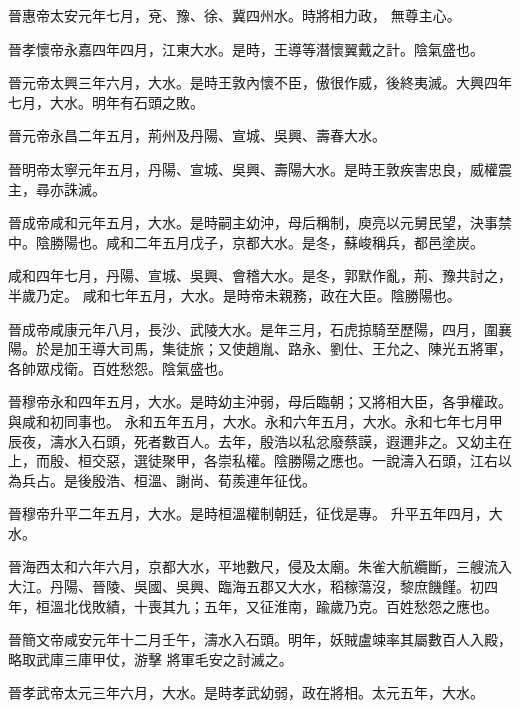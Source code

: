 \begin{pinyinscope}
 晉惠帝太安元年七月，兗、豫、徐、冀四州水。時將相力政，
 無尊主心。



 晉孝懷帝永嘉四年四月，江東大水。是時，王導等潛懷翼戴之計。陰氣盛也。



 晉元帝太興三年六月，大水。是時王敦內懷不臣，傲很作威，後終夷滅。大興四年七月，大水。明年有石頭之敗。



 晉元帝永昌二年五月，荊州及丹陽、宣城、吳興、壽春大水。



 晉明帝太寧元年五月，丹陽、宣城、吳興、壽陽大水。是時王敦疾害忠良，威權震主，尋亦誅滅。



 晉成帝咸和元年五月，大水。是時嗣主幼沖，母后稱制，庾亮以元舅民望，決事禁中。陰勝陽也。咸和二年五月戊子，京都大水。是冬，蘇峻稱兵，都邑塗炭。



 咸和四年七月，丹陽、宣城、吳興、會稽大水。是冬，郭默作亂，荊、豫共討之，半歲乃定。
 咸和七年五月，大水。是時帝未親務，政在大臣。陰勝陽也。



 晉成帝咸康元年八月，長沙、武陵大水。是年三月，石虎掠騎至歷陽，四月，圍襄陽。於是加王導大司馬，集徒旅；又使趙胤、路永、劉仕、王允之、陳光五將軍，各帥眾戍衛。百姓愁怨。陰氣盛也。



 晉穆帝永和四年五月，大水。是時幼主沖弱，母后臨朝；又將相大臣，各爭權政。與咸和初同事也。
 永和五年五月，大水。永和六年五月，大水。永和七年七月甲辰夜，濤水入石頭，死者數百人。去年，殷浩以私忿廢蔡謨，遐邇非之。又幼主在上，而殷、桓交惡，選徒聚甲，各崇私權。陰勝陽之應也。一說濤入石頭，江右以為兵占。是後殷浩、桓溫、謝尚、荀羨連年征伐。



 晉穆帝升平二年五月，大水。是時桓溫權制朝廷，征伐是專。
 升平五年四月，大水。



 晉海西太和六年六月，京都大水，平地數尺，侵及太廟。朱雀大航纜斷，三艘流入大江。丹陽、晉陵、吳國、吳興、臨海五郡又大水，稻稼蕩沒，黎庶饑饉。初四年，桓溫北伐敗績，十喪其九；五年，又征淮南，踰歲乃克。百姓愁怨之應也。



 晉簡文帝咸安元年十二月壬午，濤水入石頭。明年，妖賊盧竦率其屬數百人入殿，略取武庫三庫甲仗，游擊
 將軍毛安之討滅之。



 晉孝武帝太元三年六月，大水。是時孝武幼弱，政在將相。太元五年，大水。




\end{pinyinscope}
